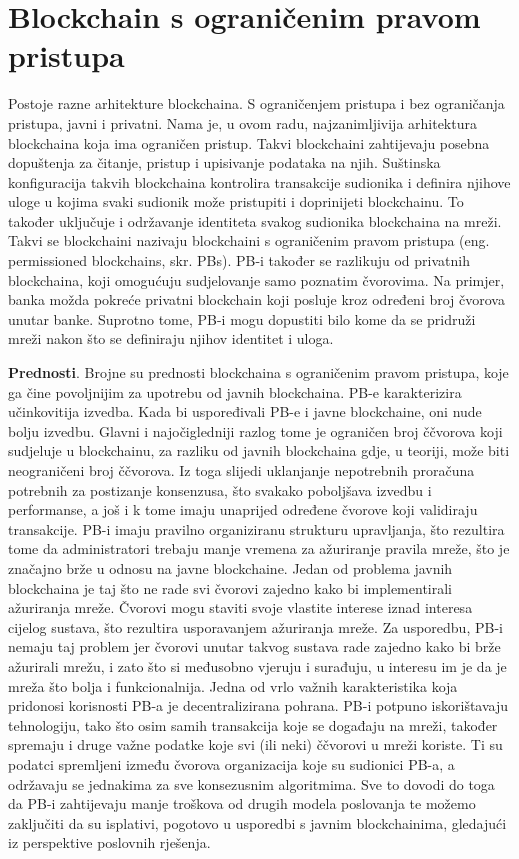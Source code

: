 \documentclass[times, utf8, diplomski]{fer}
\begin{document}
\chapter{Blockchain s ograničenim pravom pristupa}
Postoje razne arhitekture blockchaina. S ograničenjem pristupa i bez ograničanja pristupa, javni i privatni. Nama je, u ovom radu, najzanimljivija arhitektura blockchaina koja ima ograničen pristup. Takvi blockchaini zahtijevaju posebna dopuštenja za čitanje, pristup i upisivanje podataka na njih. Suštinska konfiguracija takvih blockchaina kontrolira transakcije sudionika i definira njihove uloge u kojima svaki sudionik može pristupiti i doprinijeti blockchainu. To također uključuje i održavanje identiteta svakog sudionika blockchaina na mreži. Takvi se blockchaini nazivaju blockchaini s ograničenim pravom pristupa (eng. permissioned blockchains, skr. PBs). PB-i također se razlikuju od privatnih blockchaina, koji omogućuju sudjelovanje samo poznatim čvorovima. Na primjer, banka možda pokreće privatni blockchain koji posluje kroz određeni broj čvorova unutar banke. Suprotno tome, PB-i mogu dopustiti bilo kome da se pridruži mreži nakon što se definiraju njihov identitet i uloga.

\textbf{Prednosti}. Brojne su prednosti blockchaina s ograničenim pravom pristupa, koje ga čine povoljnijim za upotrebu od javnih blockchaina. PB-e karakterizira učinkovitija izvedba. Kada bi uspoređivali PB-e i javne blockchaine, oni nude bolju izvedbu. Glavni i najočigledniji razlog tome je ograničen broj ččvorova koji sudjeluje u blockchainu, za razliku od javnih blockchaina gdje, u teoriji, može biti neograničeni broj ččvorova. Iz toga slijedi uklanjanje nepotrebnih proračuna potrebnih za postizanje konsenzusa, što svakako poboljšava izvedbu i performanse, a još i k tome imaju unaprijed određene čvorove koji validiraju transakcije. PB-i imaju pravilno organiziranu strukturu upravljanja, što rezultira tome da administratori trebaju manje vremena za ažuriranje pravila mreže, što je značajno brže u odnosu na javne blockchaine. Jedan od problema javnih blockchaina je taj što ne rade svi čvorovi zajedno kako bi implementirali ažuriranja mreže. Čvorovi mogu staviti svoje vlastite interese iznad interesa cijelog sustava, što rezultira usporavanjem ažuriranja mreže. Za usporedbu, PB-i nemaju taj problem jer čvorovi unutar takvog sustava rade zajedno kako bi brže ažurirali mrežu, i zato što si međusobno vjeruju i surađuju, u interesu im je da je mreža što bolja i funkcionalnija. Jedna od vrlo važnih karakteristika koja pridonosi korisnosti PB-a je decentralizirana pohrana. PB-i potpuno iskorištavaju tehnologiju, tako što osim samih transakcija koje se događaju na mreži, također spremaju i druge važne podatke koje svi (ili neki) ččvorovi u mreži koriste. Ti su podatci spremljeni između čvorova organizacija koje su sudionici PB-a, a održavaju se jednakima za sve konsezusnim algoritmima. Sve to dovodi do toga da PB-i zahtijevaju manje troškova od drugih modela poslovanja te možemo zaključiti da su isplativi, pogotovo u usporedbi s javnim blockchainima, gledajući iz perspektive poslovnih rješenja.
\end{document}
